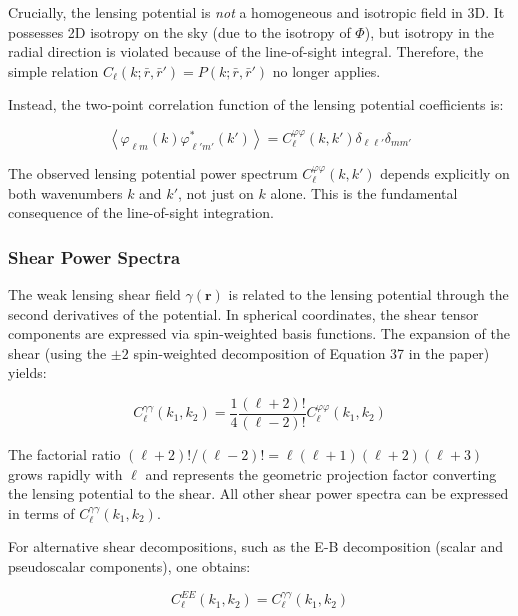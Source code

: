 Crucially, the lensing potential is \emph{not} a homogeneous and isotropic field in 3D. It possesses 2D isotropy on the sky (due to the isotropy of $\Phi$), but isotropy in the radial direction is violated because of the line-of-sight integral. Therefore, the simple relation $C_\ell(k; \bar{r}, \bar{r}') = P(k; \bar{r}, \bar{r}')$ no longer applies.

Instead, the two-point correlation function of the lensing potential coefficients is:

\begin{equation}
\left\langle \varphi_{\ell m}(k) \varphi_{\ell' m'}^*(k') \right\rangle = C_\ell^{\varphi\varphi}(k, k') \delta_{\ell\ell'} \delta_{m m'}
\label{eq:lensing_potential_corr}
\end{equation}

The observed lensing potential power spectrum $C_\ell^{\varphi\varphi}(k, k')$ depends explicitly on both wavenumbers $k$ and $k'$, not just on $k$ alone. This is the fundamental consequence of the line-of-sight integration.

\subsubsection{Shear Power Spectra}

The weak lensing shear field $\gamma(\mathbf{r})$ is related to the lensing potential through the second derivatives of the potential. In spherical coordinates, the shear tensor components are expressed via spin-weighted basis functions. The expansion of the shear (using the $\pm 2$ spin-weighted decomposition of Equation 37 in the paper) yields:

\begin{equation}
C_\ell^{\gamma\gamma}(k_1, k_2) = \frac{1}{4} \frac{(\ell + 2)!}{(\ell - 2)!} C_\ell^{\varphi\varphi}(k_1, k_2)
\label{eq:shear_power_spectrum}
\end{equation}

The factorial ratio $(\ell + 2)!/(\ell - 2)! = \ell(\ell+1)(\ell+2)(\ell+3)$ grows rapidly with $\ell$ and represents the geometric projection factor converting the lensing potential to the shear. All other shear power spectra can be expressed in terms of $C_\ell^{\gamma\gamma}(k_1, k_2)$.

For alternative shear decompositions, such as the E-B decomposition (scalar and pseudoscalar components), one obtains:

\begin{equation}
C_\ell^{EE}(k_1, k_2) = C_\ell^{\gamma\gamma}(k_1, k_2)
\label{eq:e_mode_power}
\end{equation}

